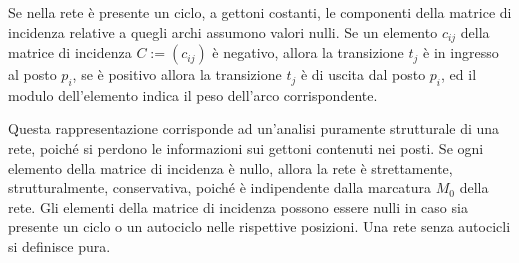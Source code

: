 \documentclass{article}
\numberwithin{equation}{subsection}
\begin{document}
Se nella rete è presente un ciclo, a gettoni costanti, le componenti della matrice di incidenza relative a quegli archi assumono valori nulli. Se un elemento $c_{ij}$ della 
matrice di incidenza $C:=(c_{ij})$ è negativo, allora la transizione $t_j$ è in ingresso al posto $p_i$, se è positivo allora la transizione $t_j$ è di uscita dal posto $p_i$, 
ed il modulo dell'elemento indica il peso dell'arco corrispondente. 


Questa rappresentazione corrisponde ad un'analisi puramente strutturale di una rete, poiché si perdono le informazioni sui gettoni contenuti nei posti. Se ogni elemento 
della matrice di incidenza è nullo, allora la rete è strettamente, strutturalmente, conservativa, poiché è indipendente dalla marcatura $M_0$ della rete. Gli elementi della 
matrice di incidenza possono essere nulli in caso sia presente un ciclo o un autociclo nelle rispettive posizioni. Una rete senza autocicli si definisce pura. 
\end{document}
